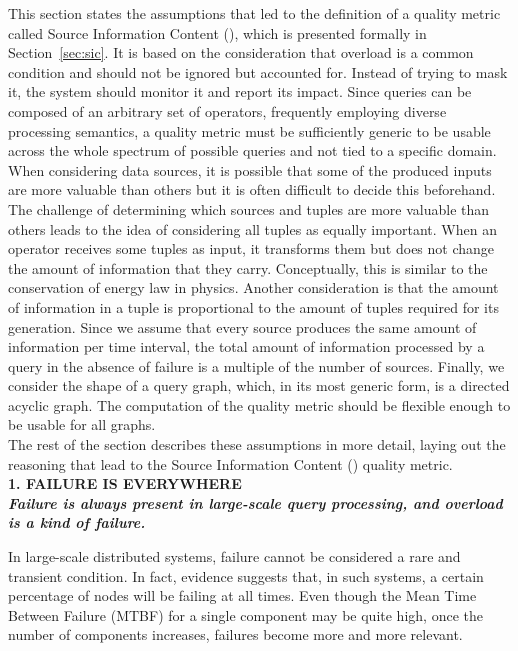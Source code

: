 This section states the assumptions that led to the definition of a quality metric called Source
Information Content (\sic), which is presented formally in Section~\ref{sec:sic}.
It is based on the consideration that overload is a common condition and should not be ignored but
accounted for. Instead of trying to mask it, the system should monitor it and report its impact.
Since queries can be composed of an arbitrary set of operators, frequently employing diverse processing
semantics, a quality metric must be sufficiently generic to be usable across the whole spectrum of
possible queries and not tied to a specific domain. \\
When considering data sources, it is possible that some of the produced inputs are more valuable than
others but it is often difficult to decide this beforehand. The challenge of determining which sources
and tuples are more valuable than others leads to the idea of considering all tuples as equally
important. When an operator receives some tuples as input, it transforms them but does not change the
amount of information that they carry.
Conceptually, this is similar to the conservation of energy law in physics.
Another consideration is that the amount of information in a tuple is proportional to the amount of
tuples required for its generation. Since we assume that every source produces the same amount of
information per time interval, the total amount of information processed by a query in the absence of
failure is a multiple of the number of sources. Finally, we consider the shape of a query graph, which,
in its most generic form, is a directed acyclic graph. The computation of the quality metric should be
flexible enough to be usable for all graphs. \\
The rest of the section describes these assumptions in more detail, laying out the reasoning that lead to
the Source Information Content (\sic) quality metric.\\

\textbf{1. FAILURE IS EVERYWHERE\\ \textit{Failure is always present in large-scale query processing,
and overload is a kind of failure.}}
  
  In large-scale distributed systems, failure cannot be considered a rare and transient condition.
  In fact, evidence suggests that, in such systems, a certain percentage of nodes will be failing at
  all times. Even though the Mean Time Between Failure (MTBF) for a single component may be quite high,
  once the number of components increases, failures become more and more relevant. 
  
